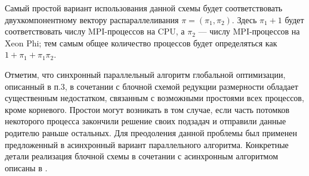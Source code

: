 \documentclass[a4paper]{article}
\begin{document}
\par
Самый простой вариант использования данной схемы будет соответствовать двухкомпонентному вектору распараллеливания \(\pi=(\pi_1,\pi_2)\). Здесь \(\pi_1+1\) будет соответствовать числу MPI-процессов на CPU, а \(\pi_2\) --- числу MPI-процессов на Xeon Phi; тем самым общее количество процессов будет определяться как \(1+\pi_1+\pi_1\pi_2\).
\par
Отметим, что синхронный параллельный алгоритм глобальной оптимизации, описанный в п.3, в сочетании с блочной схемой редукции размерности обладает существенным недостатком, связанным с возможными простоями всех процессов, кроме корневого. Простои могут возникать в том случае, если часть потомков некоторого процесса закончили решение своих подзадач и отправили данные родителю раньше остальных. Для преодоления данной проблемы был применен предложенный в \cite{examinArtcle} асинхронный вариант параллельного алгоритма. Конкретные детали реализация блочной схемы в сочетании с асинхронным алгоритмом описаны в \cite{examinArtcle}.
\end{document}
